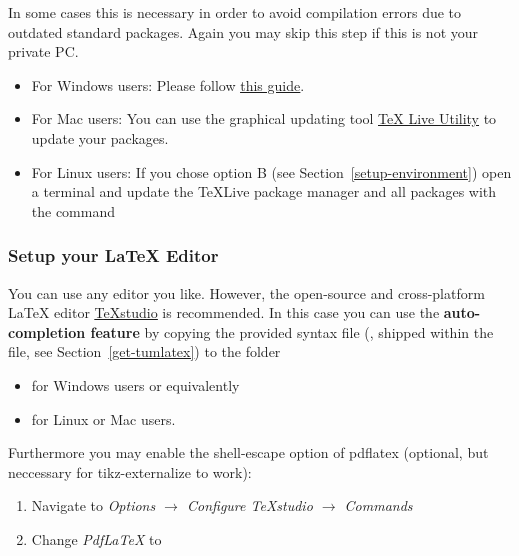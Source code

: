 In some cases this is necessary in order to avoid compilation errors due to outdated standard packages. Again you may skip this step if this is not your private PC.

\begin{itemize}
    \item For Windows users: Please follow \underline{\href{https://miktex.org/howto/update-miktex}{this guide}}.
    \item For Mac users: You can use the graphical updating tool \underline{\href{http://amaxwell.github.io/tlutility/}{TeX Live Utility}} to update your packages.
    \item For Linux users: If you chose option B (see Section~\ref{setup-environment}) open a terminal and update the TeXLive package manager and all packages with the command 
\end{itemize}

\subsubsection{Setup your LaTeX Editor}

You can use any editor you like. However, the open-source and cross-platform LaTeX editor \underline{\href{http://www.texstudio.org/}{TeXstudio}} is recommended. In this case you can use the \textbf{auto-completion feature} by copying the provided syntax file (, shipped within the  file, see Section~\ref{get-tumlatex}) to the folder

\begin{itemize}
    \item {} for Windows users or equivalently
    \item {} for Linux or Mac users.
\end{itemize}

Furthermore you may enable the shell-escape option of pdflatex (optional, but neccessary for tikz-externalize to work):

\begin{enumerate}
    \item Navigate to \textit{Options $\rightarrow$ Configure TeXstudio $\rightarrow$ Commands}
    \item Change \textit{PdfLaTeX} to 
\end{enumerate}


